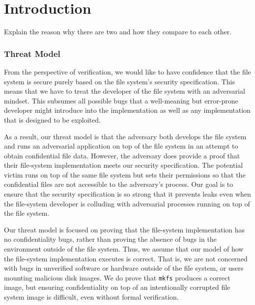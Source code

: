 \chapter{Introduction}

Explain the reason why there are two and how they compare to each other.



\subsection{Threat Model}
From the perspective of verification, we would like to have confidence
that the file system is secure purely based on the file system's security
specification.  This means that we have to treat the developer of the
file system with an adversarial mindset.  This subsumes all possible
bugs that a well-meaning but error-prone developer might introduce into
the implementation as well as any implementation that is designed to be exploited.

As a result, our threat model is that the adversary both develops the
file system and runs an adversarial application on top of the file system
in an attempt to obtain confidential file data.  However, the adversary
does provide a proof that their file-system implementation meets our
security specification.  The potential victim runs on top of the same
file system but sets their permissions so that the confidential files
are not accessible to the adversary's process.  Our goal is to ensure
that the security specification is so strong that it prevents leaks even
when the file-system developer is colluding with adversarial processes
running on top of the file system.

Our threat model is focused on proving that the file-system implementation has
no confidentiality bugs, rather than proving the absence of bugs in the
environment outside of the file system. Thus, we assume that our model
of how the file-system implementation executes is correct.  That is, we are not
concerned with bugs in unverified software or hardware outside of the file
system, or users mounting malicious disk images.  We do prove that
\texttt{mkfs} produces a correct image, but ensuring confidentiality on top of an
intentionally corrupted file system image is difficult, even without formal
verification. 


